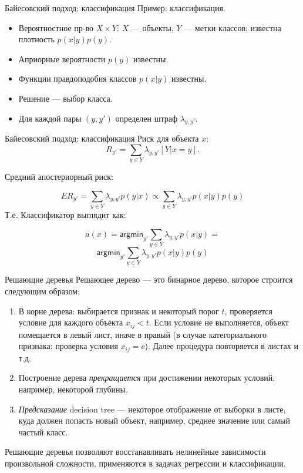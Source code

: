 \documentclass[handout]{beamer}
\begin{document}
\begin{frame}{Байесовский подход: классификация}
	Пример: классификация.\\
	\begin{itemize}
		\item Вероятностное пр-во $X\times Y$: $X$ --- объекты, $Y$ --- метки классов; известна плотность $p(x|y)p(y)$.
		\item Априорные вероятности $p(y)$ известны.
		\item Функции правдоподобия классов $p(x|y)$ известны.
		\item Решение --- выбор класса.
		\item Для каждой пары $(y, y')$ определен штраф $\lambda_{y,y'}$.

	\end{itemize}
\end{frame}

\begin{frame}{Байесовский подход: классификация}
	Риск для объекта $x$:
	\begin{equation*}
		R_{y'}=\sum_{y\in Y}\lambda_{y,y'}[Y|x=y].
	\end{equation*}

	Средний апостериорный риск:

	\begin{equation*}
		ER_{y'}=\sum_{y\in Y}\lambda_{y,y'}p(y|x)\propto\sum_{y\in Y}\lambda_{y,y'}p(x|y)p(y)
	\end{equation*}
	Т.е. Классификатор выглядит как:

	\begin{equation*}
		a(x)=\mathsf{argmin}_{y'}\sum_{y\in Y}\lambda_{y,y'}p(x|y)=
	\end{equation*}
\begin{equation*}
		\mathsf{argmin}_{y'}\sum_{y\in Y}\lambda_{y,y'}p(x|y)p(y)
	\end{equation*}
\end{frame}

\begin{frame}{Решающие деревья}
	Решающее дерево --- это бинарное дерево, которое строится следующим образом:
	\begin{enumerate}
		\item В корне дерева: выбирается признак и некоторый порог $t$, проверяется условие для каждого объекта $x_{ij} < t$. Если условие не выполняется, объект помещается в левый лист, иначе в правый (в случае категориального признака: проверка условия $x_{ij}=c$). Далее процедура повторяется в листах и т.д.
		\item Построение дерева \textit{прекращается} при достижении некоторых условий, например, некоторой глубины.
		\item \textit{Предсказание} decision tree --- некоторое отображение от выборки в листе, куда должен попасть новый объект, например, среднее значение или самый частый класс.
	\end{enumerate}
	Решающие деревья позволяют восстанавливать нелинейные зависимости произвольной сложности, применяются в задачах регрессии и классификации.
\end{frame}
	
\end{document}
